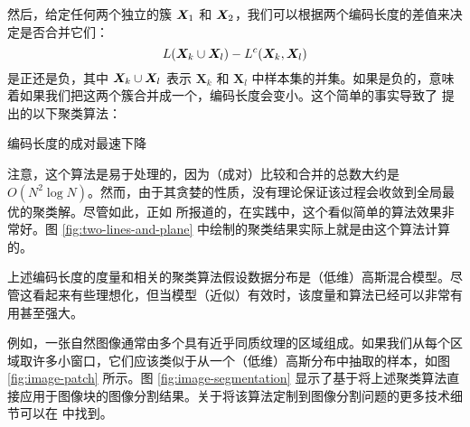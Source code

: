 \documentclass[../../book-main.tex]{subfiles}
\begin{document}
然后，给定任何两个独立的簇 $\bm{X}_1$ 和 $\bm{X}_2$，我们可以根据两个编码长度的差值来决定是否合并它们：
\begin{equation}
	L(\bm{X}_k \cup \bm{X}_l) - L^c(\bm{X}_k, \bm{X}_l)
\end{equation}
是正还是负，其中 $\bm{X}_k \cup \bm{X}_l$ 表示 $\bm X_k$ 和 $\bm X_l$ 中样本集的并集。如果是负的，意味着如果我们把这两个簇合并成一个，编码长度会变小。这个简单的事实导致了 \cite{ma2007segmentation} 提出的以下聚类算法：
\begin{algorithm}[!htbp]
	\caption{编码长度的成对最速下降}\label{alg:steepest_descent_coding_length}
	\begin{algorithmic}[1]

		 
		 
		\State{\Return{\(\cC\)}} 
		\Else
		 
		 
		\EndIf
		\EndWhile
		\State{\Return{\(\cC\)}}  
		\EndProcedure
	\end{algorithmic}
\end{algorithm}

注意，这个算法是易于处理的，因为（成对）比较和合并的总数大约是 $O(N^2\log N)$。然而，由于其贪婪的性质，没有理论保证该过程会收敛到全局最优的聚类解。尽管如此，正如 \cite{ma2007segmentation} 所报道的，在实践中，这个看似简单的算法效果非常好。图 \ref{fig:two-lines-and-plane} 中绘制的聚类结果实际上就是由这个算法计算的。


\begin{example}[图像分割]\label{eg:image-segmentation} 上述编码长度的度量和相关的聚类算法假设数据分布是（低维）高斯混合模型。尽管这看起来有些理想化，但当模型（近似）有效时，该度量和算法已经可以非常有用甚至强大。

	例如，一张自然图像通常由多个具有近乎同质纹理的区域组成。如果我们从每个区域取许多小窗口，它们应该类似于从一个（低维）高斯分布中抽取的样本，如图 \ref{fig:image-patch} 所示。图 \ref{fig:image-segmentation} 显示了基于将上述聚类算法直接应用于图像块的图像分割结果。关于将该算法定制到图像分割问题的更多技术细节可以在 \cite{Mobahi-IJCV2011} 中找到。
\end{example}
\end{document}
